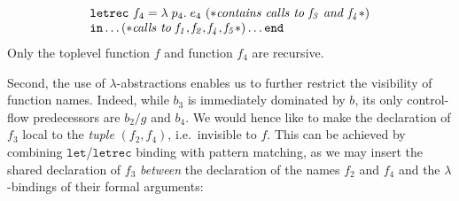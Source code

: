 \begin{equation}
\begin{array}{l}
\begin{array}{l}
\begin{array}[t]{l}
\begin{array}[t]{l}
\begin{array}[t]{l}
                \begin{array}[t]{l}
                  \mathtt{letrec}\ f_4 = \lambda\; p_4.\; e_4\
                    (* \mathit{contains\ calls\ to\ f_3\ and\ f_4}*) \\
                   \mathtt{in} \ldots 
                      (* \mathit{calls\ to\ f_1, f_2, f_4, f_5}*)
                   \ldots \mathtt{end}
                \end{array}
              \end{array}
            \end{array}
          \end{array}
        \end{array}
  \end{array}
\end{equation}
Only the toplevel function $f$ and function $f_4$ are recursive.

Second, the use of $\lambda$-abstractions enables us to further
restrict the visibility of function names. Indeed, while $b_3$ is
immediately dominated by $b$, its only control-flow predecessors are
$b_2/g$ and $b_4$. We would hence like to make the declaration of
$f_3$ local to the \emph{tuple} $(f_2, f_4)$, i.e.~invisible to $f$.
This can be achieved by combining $\mathtt{let}$/$\mathtt{letrec}$
binding with pattern matching, as we may insert the shared declaration
of $f_3$ \emph{between} the declaration of the names $f_2$ and $f_4$
and the $\lambda$-bindings of their formal arguments:

